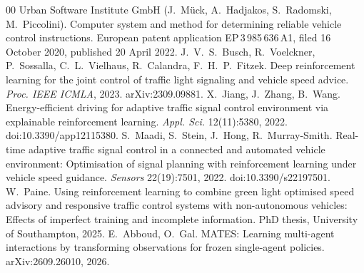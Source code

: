 \begin{thebibliography}{00}
 Urban Software Institute GmbH (J.~M\"uck, A.~Hadjakos, S.~Radomski, M.~Piccolini). Computer system and method for determining reliable vehicle control instructions. European patent application EP\,3\,985\,636\,A1, filed 16 October 2020, published 20 April 2022.
 J.~V.~S.~Busch, R.~Voelckner, P.~Sossalla, C.~L.~Vielhaus, R.~Calandra, F.~H.~P.~Fitzek. Deep reinforcement learning for the joint control of traffic light signaling and vehicle speed advice. \emph{Proc. IEEE ICMLA}, 2023. arXiv:2309.09881.
 X.~Jiang, J.~Zhang, B.~Wang. Energy-efficient driving for adaptive traffic signal control environment via explainable reinforcement learning. \emph{Appl. Sci.} 12(11):5380, 2022. doi:10.3390/app12115380.
 S.~Maadi, S.~Stein, J.~Hong, R.~Murray-Smith. Real-time adaptive traffic signal control in a connected and automated vehicle environment: Optimisation of signal planning with reinforcement learning under vehicle speed guidance. \emph{Sensors} 22(19):7501, 2022. doi:10.3390/s22197501.
 W.~Paine. Using reinforcement learning to combine green light optimised speed advisory and responsive traffic control systems with non-autonomous vehicles: Effects of imperfect training and incomplete information. PhD thesis, University of Southampton, 2025.
 E.~Abboud, O.~Gal. MATES: Learning multi-agent interactions by transforming observations for frozen single-agent policies. arXiv:2609.26010, 2026.
\end{thebibliography}

\appendices
